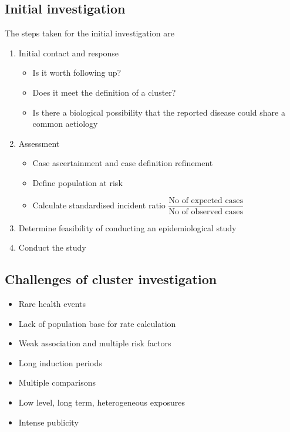 \documentclass{article}
\begin{document}
\subsection{Initial investigation}
The steps taken for the initial investigation are
\begin{enumerate}
    \item Initial contact and response
        \begin{itemize}
            \item Is it worth following up?
            \item Does it meet the definition of a cluster?
            \item Is there a biological possibility that the reported disease could share a common aetiology
        \end{itemize}
    \item Assessment
        \begin{itemize}
            \item Case ascertainment and case definition refinement
            \item Define population at risk
            \item Calculate standardised incident ratio $\dfrac{\text{No of expected cases}}{\text{No of observed cases}}$
        \end{itemize}
    \item Determine feasibility of conducting an epidemiological study
    \item Conduct the study
\end{enumerate}

\subsection{Challenges of cluster investigation}
\begin{itemize}
    \item Rare health events
    \item Lack of population base for rate calculation
    \item Weak association and multiple risk factors
    \item Long induction periods
    \item Multiple comparisons
    \item Low level, long term, heterogeneous exposures
    \item Intense publicity
\end{itemize}
\end{document}
